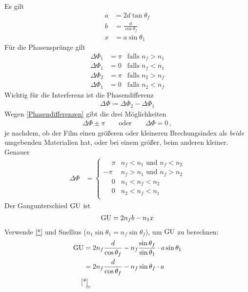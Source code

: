 \begin{enumerate}[a)]
Es gilt
\begin{align}\label{*}
  a &= 2d\tan\theta_f \\\nonumber
  b &= \frac{d}{\cos\theta_f}\\\nonumber
  x &= a\sin\theta_1
\end{align}
Für die Phasensprünge gilt
\begin{align}\label{Phasendifferenzen}
  \Delta\Phi_1 &= \pi &\text{falls } n_f>n_1\\\nonumber
  \Delta\Phi_1 &= 0   &\text{falls } n_f<n_1\\\nonumber
  \Delta\Phi_2 &= \pi &\text{falls } n_2>n_f\\\nonumber
  \Delta\Phi_1 &= 0   &\text{falls } n_2<n_f
\end{align}
Wichtig für die Interferenz ist die Phasendifferenz
\begin{gather*}
  \Delta\Phi \coloneqq \Delta\Phi_2 - \Delta\Phi_1
\end{gather*}
Wegen \eqref{Phasendifferenzen} gibt die drei Möglichkeiten
\begin{gather*}
  \Delta\Phi \pm \pi  
  \qquad\text{oder}\qquad 
  \Delta\Phi = 0\,,
\end{gather*}
je nachdem, ob der Film einen größeren oder
kleineren Brechungsindex als \emph{beide} umgebenden Materialien hat,
oder bei einem größer, beim anderen kleiner. Genauer
\begin{align*}
  \Delta\Phi 
  &=
    \begin{cases}
      \phantom{-}\pi & n_f<n_1\text{ und }n_f<n_2\\
      -\pi           & n_f>n_1\text{ und }n_f>n_2\\
      \phantom{-}0   & n_1<n_f<n_2\\ 
      \phantom{-}0   & n_2<n_f<n_1\\
    \end{cases}
\end{align*}
Der Gangunterschied $\operatorname{GU}$ ist
\begin{gather*}
  \operatorname{GU} = 2n_f b - n_1x 
\end{gather*}
Verwende \eqref{*} und Snellius ($n_1\sin\theta_1 = n_f\sin\theta_f$),
um $\operatorname{GU}$ zu berechnen:
\begin{align*}
  \GU &= 2 n_f\frac{d}{\cos\theta_f} 
        - n_f\frac{\sin\theta_f}{\sin\theta_1} \cdot a\sin\theta_1\\
      &= 2 n_f\frac{d}{\cos\theta_f} - n_f\sin\theta_f \cdot a\\
      &\overset{\mathllap{\eqref{*}}}{=} 

\end{align*}
\end{enumerate}

